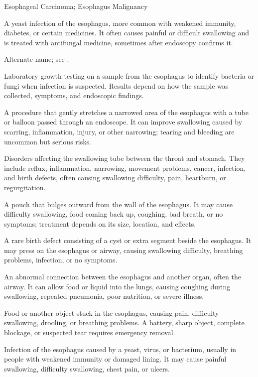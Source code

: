 \synonyms
Esophageal Carcinoma; Esophagus Malignancy

 A yeast infection of the esophagus, more common with weakened immunity, diabetes, or certain medicines. It often causes painful or difficult swallowing and is treated with antifungal medicine, sometimes after endoscopy confirms it.

 Alternate name; see .

 Laboratory growth testing on a sample from the esophagus to identify bacteria or fungi when infection is suspected. Results depend on how the sample was collected, symptoms, and endoscopic findings.

 A procedure that gently stretches a narrowed area of the esophagus with a tube or balloon passed through an endoscope. It can improve swallowing caused by scarring, inflammation, injury, or other narrowing; tearing and bleeding are uncommon but serious risks.

 Disorders affecting the swallowing tube between the throat and stomach. They include reflux, inflammation, narrowing, movement problems, cancer, infection, and birth defects, often causing swallowing difficulty, pain, heartburn, or regurgitation.

 A pouch that bulges outward from the wall of the esophagus. It may cause difficulty swallowing, food coming back up, coughing, bad breath, or no symptoms; treatment depends on its size, location, and effects.

 A rare birth defect consisting of a cyst or extra segment beside the esophagus. It may press on the esophagus or airway, causing swallowing difficulty, breathing problems, infection, or no symptoms.

 An abnormal connection between the esophagus and another organ, often the airway. It can allow food or liquid into the lungs, causing coughing during swallowing, repeated pneumonia, poor nutrition, or severe illness.

 Food or another object stuck in the esophagus, causing pain, difficulty swallowing, drooling, or breathing problems. A battery, sharp object, complete blockage, or suspected tear requires emergency removal.

 Infection of the esophagus caused by a yeast, virus, or bacterium, usually in people with weakened immunity or damaged lining. It may cause painful swallowing, difficulty swallowing, chest pain, or ulcers.

